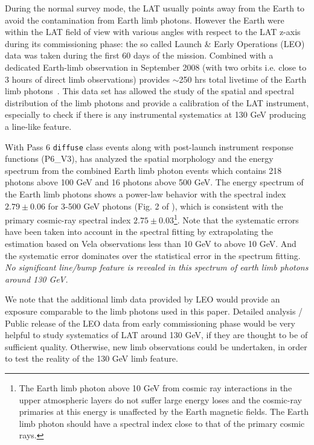 \documentclass[aps,twocolumn,prd,superscriptaddress,showpacs,nofootinbib,fixfloat]{revtex4}
\begin{document}
During the normal survey mode, the LAT usually points away
from the Earth to avoid the contamination from Earth limb photons. However the Earth
were within the LAT field of view with various angles with
respect to the LAT z-axis during its commissioning phase:
the so called Launch \& Early Operations (LEO) data was taken during the first 60 days of the mission. Combined with
a dedicated Earth-limb observation in September 2008 (with
two orbits i.e. close to 3 hours of direct limb
observations) provides $\sim$250 hrs total livetime of the Earth limb photons~\cite{FermiLimb}. This data set has allowed the study of
the spatial and spectral distribution of the limb photons
and provide a calibration of the LAT instrument, especially
to check if there is any instrumental systematics at 130 GeV
producing a line-like feature.

With Pass 6 \texttt{diffuse} class events along with post-launch
instrument response functions (P6\_V3), \cite{FermiLimb} has
analyzed the spatial morphology and the energy spectrum from
the combined Earth limb photon events which contains 218
photons above 100 GeV and 16 photons above 500 GeV. The
energy spectrum of the Earth limb photons shows a power-law
behavior with the spectral index $2.79\pm 0.06$ for 3-500
GeV photons (Fig. 2 of \cite{FermiLimb}), which is
consistent with the primary cosmic-ray spectral index
$2.75\pm 0.03$\footnote{The Earth limb photon above 10 GeV
  from cosmic ray interactions in the upper atmospheric
  layers do not suffer large energy loses and the cosmic-ray
  primaries at this energy is unaffected by the Earth
  magnetic fields. The Earth limb photon should have a
  spectral index close to that of the primary cosmic
  rays. }. Note that the systematic errors have been taken into
account in the spectral fitting by extrapolating the estimation based on Vela
observations less than 10 GeV to above 10 GeV. And the
systematic error dominates over the statistical error in the
spectrum fitting. \emph{No significant line/bump feature is revealed in this spectrum of earth limb photons around 130 GeV.}


We note that the additional limb data provided by LEO would
provide an exposure comparable to the limb photons used
in this paper. Detailed analysis / Public release of the LEO data
from early commissioning phase would be very helpful to study systematics of LAT around 130 GeV, if they are thought to be of
sufficient quality.  Otherwise, new limb observations could
be undertaken, in order to test the reality of the 130 GeV
limb feature.
\end{document}
